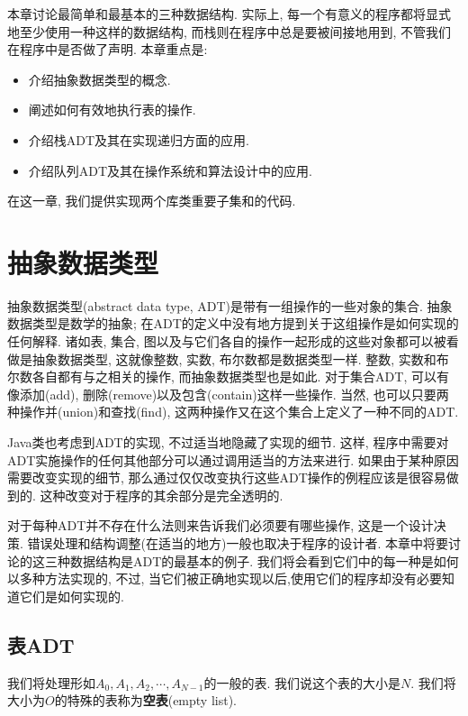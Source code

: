 \documentclass[oneside]{ctexbook}
\begin{document}
本章讨论最简单和最基本的三种数据结构. 实际上, 每一个有意义的程序都将显式地至少使用一种这样的数据结构, 而栈则在程序中总是要被间接地用到, 不管我们在程序中是否做了声明. 本章重点是:

\begin{itemize}
  \item 介绍抽象数据类型的概念.
  \item 阐述如何有效地执行表的操作.
  \item 介绍栈ADT及其在实现递归方面的应用.
  \item 介绍队列ADT及其在操作系统和算法设计中的应用.
\end{itemize}

在这一章, 我们提供实现两个库类重要子集和的代码.

\section{抽象数据类型}

抽象数据类型(abstract data type, ADT)是带有一组操作的一些对象的集合. 抽象数据类型是数学的抽象; 在ADT的定义中没有地方提到关于这组操作是如何实现的任何解释. 诸如表, 集合, 图以及与它们各自的操作一起形成的这些对象都可以被看做是抽象数据类型, 这就像整数, 实数, 布尔数都是数据类型一样. 整数, 实数和布尔数各自都有与之相关的操作, 而抽象数据类型也是如此. 对于集合ADT, 可以有像添加(add), 删除(remove)以及包含(contain)这样一些操作. 当然, 也可以只要两种操作并(union)和查找(find), 这两种操作又在这个集合上定义了一种不同的ADT.

Java类也考虑到ADT的实现, 不过适当地隐藏了实现的细节. 这样, 程序中需要对ADT实施操作的任何其他部分可以通过调用适当的方法来进行. 如果由于某种原因需要改变实现的细节, 那么通过仅仅改变执行这些ADT操作的例程应该是很容易做到的. 这种改变对于程序的其余部分是完全透明的.

对于每种ADT并不存在什么法则来告诉我们必须要有哪些操作, 这是一个设计决策. 错误处理和结构调整(在适当的地方)一般也取决于程序的设计者. 本章中将要讨论的这三种数据结构是ADT的最基本的例子. 我们将会看到它们中的每一种是如何以多种方法实现的, 不过, 当它们被正确地实现以后,使用它们的程序却没有必要知道它们是如何实现的.

\subsection{表ADT}

我们将处理形如$A_0,A_1,A_2,\cdots,A_{N-1}$的一般的表. 我们说这个表的大小是$N$. 我们将大小为$O$的特殊的表称为\textbf{空表}(empty list).
\end{document}

